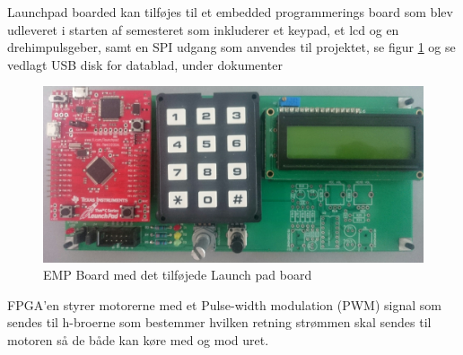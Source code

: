 Launchpad boarded kan tilføjes til et embedded programmerings board som blev udleveret i starten af semesteret som inkluderer et keypad, et lcd og en drehimpulsgeber, samt en SPI udgang som anvendes til projektet, se figur \ref{fig:EMP_BOARD} og se vedlagt USB disk for datablad, under dokumenter

\begin{figure}[!ht]
	\begin{center}
		\includegraphics[scale=0.1, angle =0]{Billeder/EMP_BOARD.JPG}
	\end{center}
\caption{EMP Board med det tilføjede Launch pad board}
\label{fig:EMP_BOARD}
\end{figure}

FPGA'en styrer motorerne med et Pulse-width modulation (PWM) signal som sendes til h-broerne som bestemmer hvilken retning strømmen skal sendes til motoren så de både kan køre med og mod uret.


